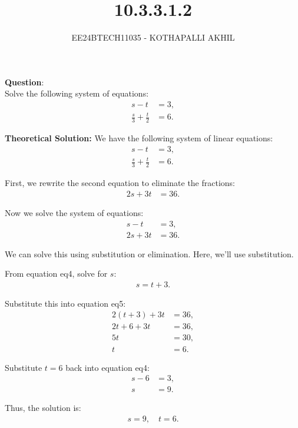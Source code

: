 \documentclass[journal]{IEEEtran}
\begin{document}

\title{10.3.3.1.2}
\author{EE24BTECH11035 - KOTHAPALLI AKHIL}
{\let\newpage\relax\maketitle}

\textbf{Question}:\\
Solve the following system of equations:
\begin{align}
    s - t &= 3,  \\
    \frac{s}{3} + \frac{t}{2} &= 6.
\end{align}

\textbf{Theoretical Solution:}
\newline
We have the following system of linear equations:
\begin{align}
    s - t &= 3, \\
    \frac{s}{3} + \frac{t}{2} &= 6.
\end{align}

First, we rewrite the second equation to eliminate the fractions:
\begin{align}
    2s + 3t &= 36.
\end{align}

Now we solve the system of equations:
\begin{align}
    s - t &= 3, \\
    2s + 3t &= 36. 
\end{align}

We can solve this using substitution or elimination. Here, we'll use substitution.

From equation {eq4}, solve for \(s\):
\begin{align}
    s = t + 3.
\end{align}

Substitute this into equation {eq5}:
\begin{align}
    2(t + 3) + 3t &= 36, \\
    2t + 6 + 3t &= 36, \\
    5t &= 30, \\
    t &= 6.
\end{align}

Substitute \(t = 6\) back into equation {eq4}:
\begin{align}
    s - 6 &= 3, \\
    s &= 9.
\end{align}

Thus, the solution is:
\begin{align}
    s = 9, \quad t = 6.
\end{align}
\end{document}
